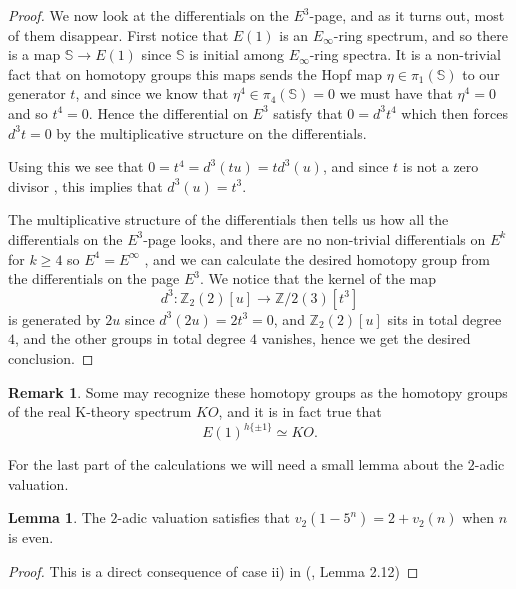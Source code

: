 \documentclass[a4paper]{article} %
\theoremstyle{definition}
\newtheorem{lemma}[theorem]{Lemma}
\newtheorem{remark}[theorem]{Remark}
\newcommand{\Z}{\mathbb{Z}}
\newcommand{\Sph}{\mathbb{S}}
\begin{document}
\begin{proof}
We now look at the differentials on the $E^3$-page, and as it turns out, most of them disappear. First notice that $E(1)$ is an $E_\infty$-ring spectrum, and so there is a map $\Sph \to E(1)$ since $\Sph$ is initial among $E_\infty$-ring spectra. It is a non-trivial fact that on homotopy groups this maps sends the Hopf map $\eta \in \pi_1(\Sph)$ to our generator $t$, and since we know that $\eta^4 \in \pi_4(\Sph) = 0$ we must have that $\eta^4 = 0$ and so $t^4 = 0$. Hence the differential on $E^3$ satisfy that $0 = d^3 t^4$
which then forces $d^3t = 0$ by the multiplicative structure on the differentials.

 Using this we see that $0 = t^4 = d^3(tu)=td^3(u)$, and since $t$ is not a zero divisor , this implies that $d^3(u) = t^3$.


The multiplicative structure of the differentials then tells us how all the differentials on the $E^3$-page looks, and there are no non-trivial differentials on $E^k$ for $k \ge 4$ so $E^4 = E^\infty$ , and we can calculate the desired homotopy group from the differentials on the page $E^3$. We notice that the kernel of the map
\[
d^3 \colon \Z_2(2)[u] \to \Z/2(3)[t^3]
\]
is generated by $2u$ since $d^3(2u)=2t^3 = 0$, and $\Z_2(2)[u]$ sits in total degree $4$, and the other groups in total degree $4$ vanishes, hence we get the desired conclusion. 
\end{proof}

\begin{remark}
  Some may recognize these homotopy groups as the homotopy groups of the real K-theory spectrum $KO$, and it is in fact true that
  \[
    E(1)^{h\{ \pm1\}} \simeq KO.
  \]
\end{remark}

For the last part of the calculations we will need a small lemma about the $2$-adic valuation.

\begin{lemma}\label{lemma:2adicval}
  The $2$-adic valuation satisfies that $v_2(1-5^n) = 2 + v_2(n)$ when $n$ is even.
\end{lemma}
\begin{proof}
This is a direct consequence of case ii) in (\cite{adams}, Lemma 2.12)
\end{proof}
\end{document}
